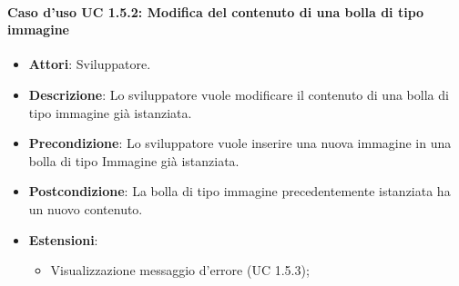 \paragraph{Caso d'uso UC 1.5.2: Modifica del contenuto di una bolla di tipo immagine}

\FloatBarrier
\begin{itemize}
\item\textbf{Attori}: Sviluppatore.
\item\textbf{Descrizione}: Lo sviluppatore vuole modificare il contenuto di una bolla di tipo immagine già istanziata.
\item\textbf{Precondizione}: Lo sviluppatore vuole inserire una nuova immagine in una bolla di tipo Immagine già istanziata.
\item\textbf{Postcondizione}: La bolla di tipo immagine precedentemente istanziata ha un nuovo contenuto.
\item \textbf{Estensioni}: 
\begin{itemize}
\item Visualizzazione messaggio d'errore (UC 1.5.3);
\end{itemize}
\end{itemize}
